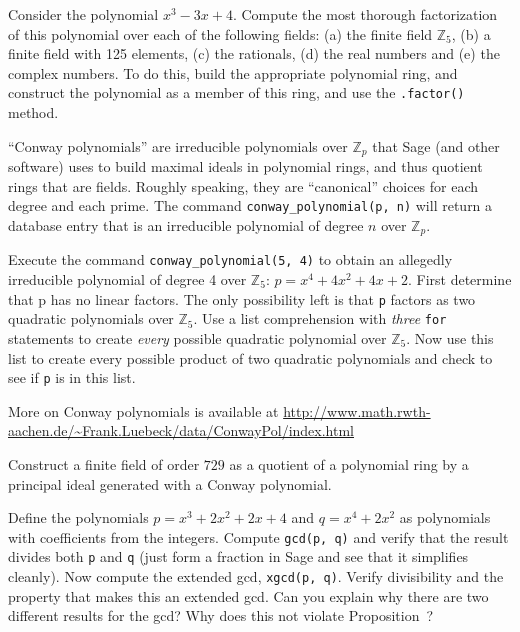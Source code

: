 \begin{sageverbatim}\end{sageverbatim}
%
%
Consider the polynomial $x^3-3x+4$.  Compute the most thorough factorization of this polynomial over each of the following fields:  (a) the finite field ${\mathbb Z}_5$, (b) a finite field with 125 elements, (c) the rationals, (d) the real numbers and (e) the complex numbers.  To do this, build the appropriate polynomial ring, and construct the polynomial as a member of this ring, and use the \verb?.factor()? method.
\begin{sageverbatim}\end{sageverbatim}
%
%
``Conway polynomials'' are irreducible polynomials over ${\mathbb Z}_p$ that Sage (and other software) uses to build maximal ideals in polynomial rings, and thus quotient rings that are fields. Roughly speaking, they are ``canonical'' choices for each degree and each prime.  The command \verb?conway_polynomial(p, n)? will return a database entry that is an irreducible polynomial of degree $n$ over ${\mathbb Z}_p$.\par
%
Execute the command \verb?conway_polynomial(5, 4)? to obtain an allegedly irreducible polynomial of degree 4 over ${\mathbb Z}_5$:  $p = x^{4} + 4x^{2} + 4x + 2$.  First determine that p has no linear factors.  The only possibility left is that \verb?p? factors as two quadratic polynomials over ${\mathbb Z}_5$.  Use a list comprehension with \emph{three} \verb?for? statements to create \emph{every} possible quadratic polynomial over ${\mathbb Z}_5$.  Now use this list to create every possible product of two quadratic polynomials and check to see if \verb?p? is in this list.\par
%
More on Conway polynomials is available at
\url{http://www.math.rwth-aachen.de/~Frank.Luebeck/data/ConwayPol/index.html}
\begin{sageverbatim}\end{sageverbatim}
%
%
Construct a finite field of order $729$ as a quotient of a polynomial ring by a principal ideal generated with a Conway polynomial.
\begin{sageverbatim}\end{sageverbatim}
%
%
Define the polynomials $p = x^3 + 2x^2 + 2x + 4$ and $q = x^4 + 2x^2$ as polynomials with coefficients from the integers.  Compute \verb?gcd(p, q)? and verify that the result divides both \verb?p? and \verb?q? (just form a fraction in Sage and see that it simplifies cleanly).  Now compute the extended gcd, \verb?xgcd(p, q)?.  Verify divisibility and the property that makes this an extended gcd.  Can you explain why there are two different results for the gcd?  Why does this not violate Proposition~?
